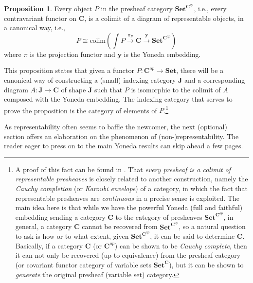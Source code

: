 \documentclass[11pt]{book}
\theoremstyle{definition}
\theoremstyle{definition}
\theoremstyle{definition}
\newtheorem{proposition}{Proposition}[section]
\theoremstyle{theorem}
\theoremstyle{definition}
\begin{document}
\begin{proposition}
	Every object $P$ in the presheaf category  $\textbf{Set}^{\textbf{C}^{op}}$, i.e., every contravariant functor on $\textbf{C}$, is a colimit of a diagram of representable objects, in a canonical way, i.e., 
	\begin{equation*}
	P \cong \text{colim}(\int P \xrightarrow{\pi_P} \textbf{C} \xrightarrow{\textbf{y}} \textbf{Set}^{\textbf{C}^{op}})
	\end{equation*} 
	where $\pi$ is the projection functor and $\textbf{y}$ is the Yoneda embedding.  
\end{proposition} 
This proposition states that given a functor $P: \textbf{C}^{op} \rightarrow \textbf{Set}$, there will be a canonical way of constructing a (small) indexing category $\textbf{J}$ and a corresponding diagram $A: \textbf{J} \rightarrow \textbf{C}$ of shape $\textbf{J}$ such that $P$ is isomorphic to the colimit of $A$ composed with the Yoneda embedding. The indexing category that serves to prove the proposition is the category of elements of $P$.\footnote{A proof of this fact can be found in \cite{riehl_category_2016}. That \textit{every presheaf is a colimit of representable presheaves} is closely related to another construction, namely the \textit{Cauchy completion} (or \textit{Karoubi envelope}) of a category, in which the fact that representable presheaves are \textit{continuous} in a precise sense is exploited. The main idea here is that while we have the powerful Yoneda (full and faithful) embedding sending a category \textbf{C} to the category of presheaves $\textbf{Set}^{\textbf{C}^{op}}$, in general, a category \textbf{C} cannot be recovered from $\textbf{Set}^{\textbf{C}^{op}}$, so a natural question to ask is how or to what extent, given $\textbf{Set}^{\textbf{C}^{op}}$, it can be said to determine \textbf{C}. Basically, if a category \textbf{C} (or $\textbf{C}^{op}$) can be shown to be \textit{Cauchy complete}, then it can not only be recovered (up to equivalence) from the presheaf category (or covariant functor category of variable sets $\textbf{Set}^{\textbf{C}}$), but it can be shown to \textit{generate} the original presheaf (variable set) category.} \par 
As representability often seems to baffle the newcomer, the next (optional) section offers an elaboration on the phenomenon of (non-)representability. The reader eager to press on to the main Yoneda results can skip ahead a few pages.  
\end{document}
